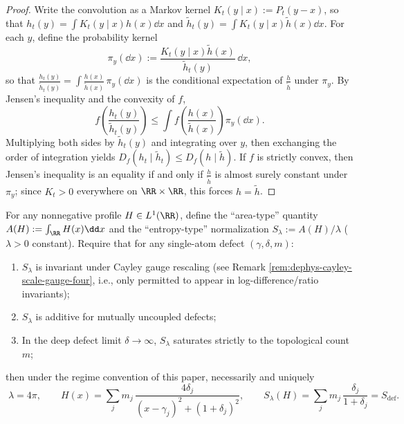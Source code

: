 \begin{proof}
Write the convolution as a Markov kernel \(K_t(y\mid x):=P_t(y-x)\), so that
\(
h_t(y)=\int K_t(y\mid x)h(x)\dd x
\) and \(
\tilde h_t(y)=\int K_t(y\mid x)\tilde h(x)\dd x
\).
For each \(y\), define the probability kernel
\[
\pi_y(\dd x):=\frac{K_t(y\mid x)\tilde h(x)}{\tilde h_t(y)}\,\dd x,
\]
so that
\(
\frac{h_t(y)}{\tilde h_t(y)}=\int \frac{h(x)}{\tilde h(x)}\,\pi_y(\dd x)
\)
is the conditional expectation of \(\frac{h}{\tilde h}\) under \(\pi_y\).
By Jensen's inequality and the convexity of \(f\),
\[
f\!\left(\frac{h_t(y)}{\tilde h_t(y)}\right)
\le
\int f\!\left(\frac{h(x)}{\tilde h(x)}\right)\pi_y(\dd x).
\]
Multiplying both sides by \(\tilde h_t(y)\) and integrating over \(y\), then exchanging the order of integration yields
\(
D_f(h_t\mid \tilde h_t)\le D_f(h\mid \tilde h)
\).
If \(f\) is strictly convex, then Jensen's inequality is an equality if and only if \(\frac{h}{\tilde h}\) is almost surely constant under \(\pi_y\); since \(K_t>0\) everywhere on \(\RR\times\RR\), this forces \(h=\tilde h\). \qedhere
\end{proof}
\begin{proposition}\label{prop:xi-fourpi-entropy-normalization-uniqueness}
For any nonnegative profile \(H\in L^1(\RR)\), define the ``area-type'' quantity \(A(H):=\int_{\RR}H(x)\dd x\) and the ``entropy-type'' normalization \(S_\lambda:=A(H)/\lambda\) (\(\lambda>0\) constant).
Require that for any single-atom defect \((\gamma,\delta,m)\):
\begin{enumerate}
  \item \(S_\lambda\) is invariant under Cayley gauge rescaling (see Remark \ref{rem:dephys-cayley-scale-gauge-four}, i.e., only permitted to appear in log-difference/ratio invariants);
  \item \(S_\lambda\) is additive for mutually uncoupled defects;
  \item In the deep defect limit \(\delta\to\infty\), \(S_\lambda\) saturates strictly to the topological count \(m\);
\end{enumerate}
then under the regime convention of this paper, necessarily and uniquely
\[
\boxed{\;
\lambda=4\pi,\qquad
H(x)=\sum_{j}m_j\,\frac{4\delta_j}{(x-\gamma_j)^2+(1+\delta_j)^2},\qquad
S_\lambda(H)=\sum_{j}m_j\,\frac{\delta_j}{1+\delta_j}=S_{\mathrm{def}}.\;}
\]
\end{proposition}
